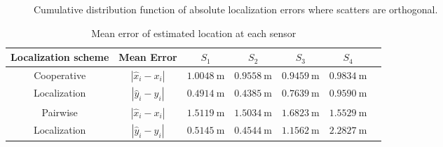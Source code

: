 \documentclass[10pt, twocolumn, final]{IEEEtran}
\begin{document}
\begin{figure}
  \centering
  \caption{Cumulative distribution function of absolute localization errors where scatters are orthogonal.}\label{Figure-CDF-Ortho}
\end{figure}

\begin{table*}[!t]
\caption[short title]{Mean error of estimated location at each sensor} \label{Table-ME}
\centering
\begin{tabular}{|c||c|c|c|c|c|c|}

\hline Localization scheme & Mean Error & $S_1$ & $S_2$ & $S_3$ & $S_4$ \\
\hline

Cooperative & $|\hat{x}_i - x_i|$ & $1.0048 \ \mathrm{m}$  &  $0.9558 \ \mathrm{m}$  &  $0.9459 \ \mathrm{m}$  &  $0.9834 \ \mathrm{m}$ \\
\cline{2-6}
Localization & $|\hat{y}_i - y_i|$ & $0.4914 \ \mathrm{m}$ &  $0.4385 \ \mathrm{m}$ &  $0.7639 \ \mathrm{m}$  & $0.9590 \ \mathrm{m}$ \\
\hline

Pairwise & $|\hat{x}_i - x_i|$ & $1.5119 \ \mathrm{m}$  &  $1.5034 \ \mathrm{m}$  &  $1.6823 \ \mathrm{m}$  &  $1.5529 \ \mathrm{m}$ \\
\cline{2-6}
Localization & $|\hat{y}_i - y_i|$ & $0.5145 \ \mathrm{m}$ &  $0.4544 \ \mathrm{m}$ &  $1.1562 \ \mathrm{m}$  & $2.2827 \ \mathrm{m}$ \\
\hline

\end{tabular} \\[3ex]
\end{table*}
\end{document}
